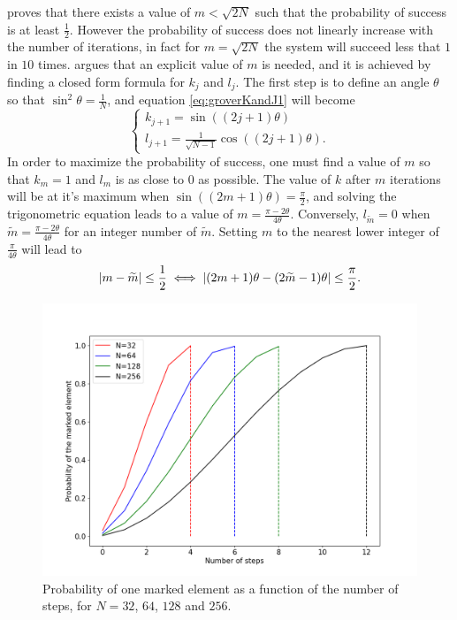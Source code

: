 \documentclass[../../dissertation.tex]{subfiles}
\begin{document}
\cite{grover1996} proves that there exists a value of $m < \sqrt{2N}$ such that
the probability of success is at least $\frac{1}{2}$. However the probability
of success does not linearly increase with the number of iterations, in fact
for $m=\sqrt{2N}$ the system will succeed less that $1$ in $10$ times.
\cite{boyer1996} argues that an explicit value of $m$ is needed, and it is
achieved by finding a closed form formula for $k_j$ and $l_j$. The first step
is to define an angle $\theta$ so that $\sin^2\theta = \frac{1}{N}$, and
equation \ref{eq:groverKandJ1} will become
\begin{equation}
	\begin{cases}
		k_{j+1} = \sin{((2j+1)\theta)} 
		\\l_{j+1} = \frac{1}{\sqrt{N-1}}\cos{((2j+1)\theta)}.
	\end{cases}\label{eq:groverKandJ2}
\end{equation}
In order to maximize the probability of success, one must find a value of $m$
so that $k_m = 1$ and $l_m$ is as close to $0$ as possible. The value of $k$
after $m$ iterations will be at it's maximum when $\sin{((2m+1)\theta)} =
\frac{\pi}{2}$, and solving the trigonometric equation leads to a value of $m =
\frac{\pi-2\theta}{4\theta}$. Conversely, $l_{\widetilde{m}} = 0$ when
$\widetilde{m} = \frac{\pi-2\theta}{4\theta}$ for an integer number of
$\widetilde{m}$. Setting $m$ to the nearest lower integer of
$\frac{\pi}{4\theta}$ will lead to
\begin{equation}
	\abs{m-\widetilde{m}} \leq \frac{1}{2} \iff \abs{(2m+1)\theta - (2\widetilde{m}-1)\theta} \leq \frac{\pi}{2}.
\end{equation}
\begin{figure}[!h]
	\centering
	\includegraphics[scale=0.40]{img/Grover/GroverOneMarked3264128256}
	\caption{Probability of one marked element as a function of the number of steps, for $N=32$, $64$, $128$ and $256$.} 
	\label{fig:groverOneMarked163264128}
\end{figure}
\end{document}
